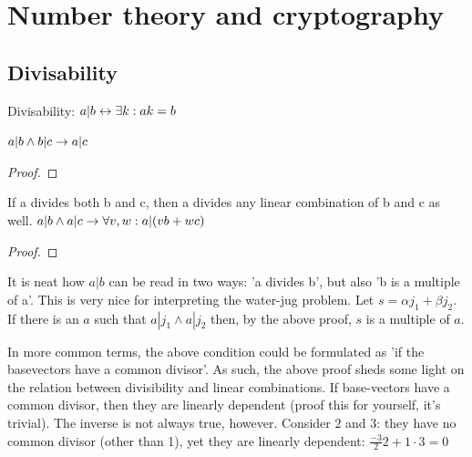 \section{Number theory and cryptography}

\subsection{Divisability}

\begin{definition}
    Divisability: $a|b \leftrightarrow \exists k: ak = b$
\end{definition}

\begin{theorem}
    $ a|b \land b|c \to a|c  $
\end{theorem}

\begin{proof}
\end{proof}

\begin{theorem}
    If a divides both b and c, then a divides any linear combination of b and c as well.  $ a|b \land a|c \to \forall v, w: a| (vb + wc)  $
\end{theorem}

\begin{proof}
\end{proof}

It is neat how $a|b$ can be read in two ways: 'a divides b', but also 'b is a multiple of a'. This is very nice for interpreting the water-jug problem.
Let $s = \alpha j_1 +\beta j_2$. If there is an $a$ such that $a|j_1 \land a|j_2$ then, by the above proof, $s$ is a multiple of $a$. 

In more common terms, the above condition could be formulated as 'if the basevectors have a common divisor'. As such, the above proof sheds some light on the relation between divisibility and linear combinations. If base-vectors have a common divisor, then they are linearly dependent (proof this for yourself, it's trivial).
The inverse is not always true, however. Consider $2$ and $3$: they have no common divisor (other than 1), yet they are linearly dependent: $\frac{-3}{2}2 + 1 \cdot 3 = 0$


